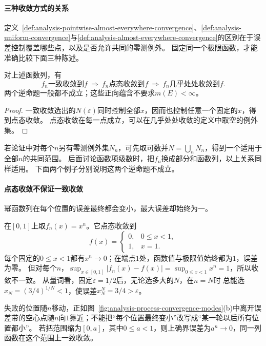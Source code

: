 \paragraph{三种收敛方式的关系}
定义~\ref{def:analysis-pointwise-almost-everywhere-convergence}、\ref{def:analysis-uniform-convergence}与\ref{def:analysis-almost-everywhere-convergence}的区别在于误差控制覆盖哪些点，以及是否允许共同的零测例外。
固定同一个极限函数，才能准确比较下面三种陈述。
\begin{theorem}[三种函数列收敛方式的关系]
\label{thm:analysis-convergence-mode-implications}
对上述函数列，有
\[
 f_n\text{一致收敛到}f
 \ \Longrightarrow\ f_n\text{点态收敛到}f
 \ \Longrightarrow\ f_n\text{几乎处处收敛到}f.
\]
两个逆命题一般都不成立；这些正向蕴含不要求$m(E)<\infty$。
\end{theorem}
\begin{proof}
一致收敛选出的$N(\varepsilon)$同时控制全部$x$，因而也控制任意一个固定的$x$，得到点态收敛。
点态收敛在每一点成立，可以在几乎处处收敛的定义中取空的例外集。
\end{proof}

若论证中对每个$n$另有零测例外集$N_n$，可先取可数并$N=\bigcup_nN_n$，得到一个适用于全部$n$的共同范围。
后面讨论函数项级数时，把$f_n$换成部分和函数列，以上关系同样适用。
下面两个例子分别说明这两个逆命题不成立。

\paragraph{点态收敛不保证一致收敛}
幂函数列在每个位置的误差最终都会变小，最大误差却始终为一。
\begin{example}[幂函数列点态收敛但不一致收敛]
\label{ex:analysis-power-not-uniform}
在$[0,1]$上取$f_n(x)=x^n$。它点态收敛到
\[
 f(x)=
 \begin{cases}
  0,&0\leq x<1,\\
  1,&x=1.
 \end{cases}
\]
每个固定的$0\leq x<1$都有$x^n\to0$；在端点$1$处，函数值与极限值始终都为$1$，误差为零。
但对每个$n$，$\sup_{x\in[0,1]}|f_n(x)-f(x)|=\sup_{0\leq x<1}x^n=1$，所以收敛不一致。
从量词看，固定$\varepsilon=1/2$后，无论选多大的$N$，在$n=N$时
总能选$x_N=(3/4)^{1/N}<1$，使误差$x_N^N=3/4>\varepsilon$。
\end{example}
失败的位置随$n$移动，正如图~\ref{fig:analysis-process-convergence-modes}(b)中离开误差带的空心点随$n$向$1$靠近；不能把“每个位置最终变小”改写成“某一轮以后所有位置都小”。
若把范围缩为$[0,a]$，其中$0\leq a<1$，则上确界误差为$a^n\to0$，同一列函数在这个范围上一致收敛。


